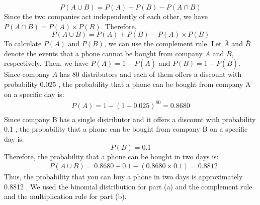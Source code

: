 \documentclass[12pt]{article}
\begin{document}
$$
P(A \cup B)=P(A)+P(B)-P(A \cap B)
$$
Since the two companies act independently of each other, we have $P(A \cap B)=P(A) \times P(B)$. Therefore,
$$
P(A \cup B)=P(A)+P(B)-P(A) \times P(B)
$$
To calculate $P(A)$ and $P(B)$, we can use the complement rule. Let $\bar{A}$ and $\bar{B}$ denote the events that a phone cannot be bought from company $A$ and $B$, respectively. Then, we have $P(A)=1-P(\bar{A})$ and $P(B)=1-P(\bar{B})$. Since company $A$ has $80$ distributors and each of them offers a discount with probability 0.025 , the probability that a phone can be bought from company A on a specific day is:
$$
\begin{aligned}
P(A)=1-(1-0.025)^{80} = 0.8680 \\
\end{aligned}
$$
Since company B has a single distributor and it offers a discount with probability 0.1 , the probability that a phone can be bought from company B on a specific day is:
$$
P(B)=0.1
$$
Therefore, the probability that a phone can be bought in two days is:
$$
\begin{aligned}
& P(A \cup B)= 0.8680 + 0.1- (0.8680  \times 0.1) = 0.8812
\end{aligned}
$$
Thus, the probability that you can buy a phone in two days is approximately 0.8812 . We used the binomial distribution for part (a) and the complement rule and the multiplication rule for part (b).
\newpage
\end{document}
